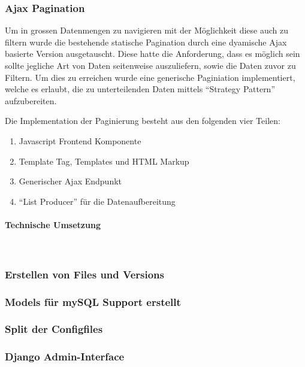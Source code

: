 \subsubsection{Ajax Pagination}
Um in grossen Datenmengen zu navigieren mit der Möglichkeit diese auch zu
filtern wurde die bestehende statische Pagination durch eine dyamische Ajax
basierte Version ausgetauscht. Diese hatte die Anforderung, dass es möglich sein
sollte jegliche Art von Daten seitenweise auszuliefern, sowie die Daten zuvor zu
Filtern. Um dies zu erreichen wurde eine generische Paginiation implementiert,
welche es erlaubt, die zu unterteilenden Daten mittels \enquote{Strategy
Pattern}\cite{gamma1994design} aufzubereiten.

Die Implementation der Paginierung besteht aus den folgenden vier Teilen:
\begin{enumerate}
	\item Javascript Frontend Komponente
	\item Template Tag, Templates und HTML Markup
	\item Generischer Ajax Endpunkt
	\item \enquote{List Producer} für die Datenaufbereitung
\end{enumerate}



\paragraph{Technische Umsetzung} \hspace{0pt} \\


\subsubsection{Erstellen von Files und Versions}

\subsubsection{Models für mySQL Support erstellt}

\subsubsection{Split der Configfiles}

\subsubsection{Django Admin-Interface}
